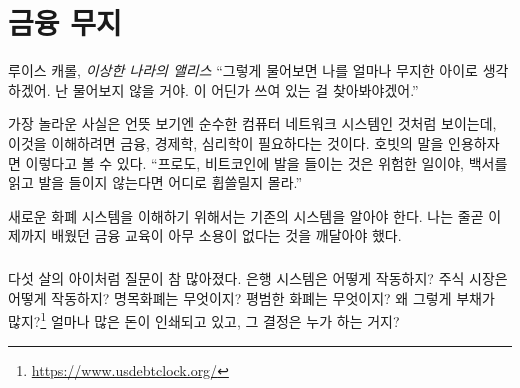 \chapter{금융 무지}
\label{les:8}

\begin{chapquote}{루이스 캐롤, \textit{이상한 나라의 앨리스}}
	\enquote{그렇게 물어보면 나를 얼마나 무지한 아이로 생각하겠어. 난 물어보지 않을 거야. 이 어딘가 쓰여 있는 걸 찾아봐야겠어.}
\end{chapquote}

가장 놀라운 사실은 언뜻 보기엔 순수한 컴퓨터 네트워크 시스템인 것처럼 보이는데,
이것을 이해하려면 금융, 경제학, 심리학이 필요하다는 것이다.
호빗의 말을 인용하자면 이렇다고 볼 수 있다. 
\enquote{프로도, 비트코인에 발을 
	들이는 것은 위험한 일이야, 백서를 읽고 발을 들이지 않는다면 어디로 휩쓸릴지 몰라.}

새로운 화폐 시스템을 이해하기 위해서는 기존의 시스템을 알아야 한다. 
나는 줄곧 이제까지 배웠던 금융 교육이 아무 소용이 없다는 것을 깨달아야 했다.

\paragraph{}
다섯 살의 아이처럼 질문이 참 많아졌다. 
은행 시스템은 어떻게 작동하지? 주식 시장은 어떻게 작동하지? 
명목화폐는 무엇이지? 평범한 화폐는 무엇이지? 왜 그렇게 부채가 많지?\footnote{\url{https://www.usdebtclock.org/}} 
얼마나 많은 돈이 인쇄되고 있고, 그 결정은 누가 하는 거지?

\newpage


